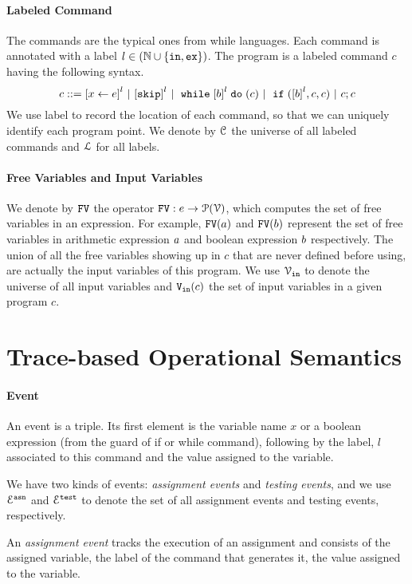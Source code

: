 \paragraph{Labeled Command}
The commands are the typical ones from while languages. Each command is annotated with a label $l \in (\mathbb{N} \cup \{\mathtt{in}, \mathtt{ex}\})$. The program is a labeled command $c$ having the following syntax. 
\[
{c} ::= 
\clabel{\assign{x}{\expr}}^l 
~|~  \clabel{\eskip}^l
~|~ \ewhile \clabel{\bexpr}^{l} \edo ({c})
~|~ \eif(\clabel{\bexpr}^{l} , {c}, {c}) 
~|~ {c};{c} 
\]
We use label to record
the location of each command, so that we can uniquely identify each program point.
We denote by $\mathcal{C}$ the universe of all labeled commands and $\mathcal{L}$ for all labels.

\paragraph{Free Variables and Input Variables}
  We denote by $\mathtt{FV}$ the operator $\mathtt{FV}: e \to \mathcal{P}(\mathcal{V})$, which computes the set of free variables in an expression. For example,
  $\mathtt{FV}(a)$ and $\mathtt{FV}(b)$ represent the set of free variables in arithmetic
  expression $a$ and boolean expression $b$ respectively.
  The union of all the free variables
  showing up in $c$ that are never defined before using, are actually the input variables of this program.
  We use $\mathcal{V}_{\mathtt{in}}$ to denote the universe of all input variables and $\mathtt{V_{\mathtt{in}}}(c)$ the set of input variables in a given program $c$.

\section{{Trace-based Operational Semantics}}
\label{sec:language-semantics}
\paragraph{Event}
An event is a triple.
Its first element is the variable name $x$
or a boolean expression (from the guard of if or while command), 
following by 
 the label, $l$ associated to this command and the value assigned to the variable.

 We have two kinds of events: \emph{assignment events} and \emph{testing events},
 and we use $\mathcal{E}^{\mathtt{{asn}}}$ and $\mathcal{E}^{\mathtt{{test}}}$ to denote the set of all assignment events and testing events, respectively.

 An \emph{assignment event} tracks the execution of an assignment and consists of the assigned variable, the label of the command that generates it, the value assigned to the variable.

